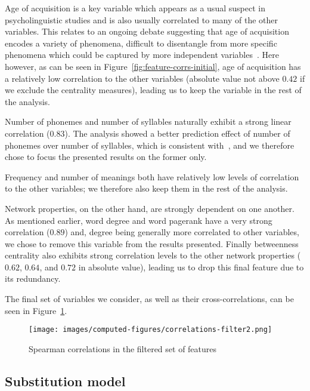 
Age of acquisition is a key variable which appears as a usual suspect in psycholinguistic studies and is also usually correlated to many of the other variables.
This relates to an ongoing debate suggesting that age of acquisition encodes a variety of phenomena, difficult to disentangle from more specific phenomena which could be captured by more independent variables~\CN{}.
Here however, as can be seen in Figure~\ref{fig:feature-corrs-initial}, age of acquisition has a relatively low correlation to the other variables (absolute value not above $0.42$ if we exclude the centrality measures), leading us to keep the variable in the rest of the analysis.

Number of phonemes and number of syllables naturally exhibit a strong linear correlation ($0.83$).
The analysis showed a better prediction effect of number of phonemes over number of syllables, which is consistent with~\citet{nick-diss}, and we therefore chose to focus the presented results on the former only.

Frequency and number of meanings both have relatively low levels of correlation to the other variables; we therefore also keep them in the rest of the analysis.

\bigskip
Network properties, on the other hand, are strongly dependent on one another.
As mentioned earlier, word degree and word pagerank have a very strong correlation ($0.89$) and, degree being generally more correlated to other variables, we chose to remove this variable from the results presented.
Finally betweenness centrality also exhibits strong correlation levels to the other network properties ($0.62$, $0.64$, and $0.72$ in absolute value), leading us to drop this final feature due to its redundancy.

The final set of variables we consider, as well as their cross-correlations, can be seen in Figure~\ref{fig:feature-corrs-filtered}.

\begin{figure}[!th]
    \centering
    \texttt{[image: images/computed-figures/correlations-filter2.png]}
    \caption{Spearman correlations in the filtered set of features}
    \label{fig:feature-corrs-filtered}
\end{figure}


\subsection{Substitution model}


